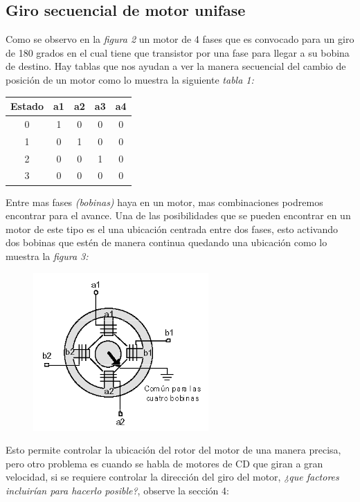 \documentclass[11pt,a4paper]{article}
\begin{document}
\newpage

\subsection{Giro secuencial de motor unifase}
Como se observo en la \emph{figura 2} un motor de 4 fases que es convocado para un giro de 180 grados en el cual tiene que transistor por una fase para llegar a su bobina de destino. Hay tablas que nos ayudan a ver la manera secuencial del cambio de posición de un motor como lo muestra la siguiente \emph{tabla 1:}


\begin{center}
\begin{tabular}{|c|c|c|c|c|}
\hline 
Estado & a1 & a2 & a3 & a4 \\ 
\hline 
0 & 1 & 0 & 0 & 0 \\ 
\hline 
1 & 0 & 1 & 0 & 0 \\ 
\hline 
2 & 0 & 0 & 1 & 0\\ 
\hline 
3 & 0 & 0 & 0 & 0\\
\hline
\end{tabular} 
\end{center}

Entre mas fases \emph{(bobinas)} haya en un motor, mas combinaciones podremos encontrar para el avance. Una de las posibilidades que se pueden encontrar en un motor de este tipo es el una ubicación centrada entre dos fases, esto activando dos bobinas que estén de manera continua quedando una ubicación como lo muestra la \emph{figura 3:}

\begin{figure}[h]
\begin{center}
\includegraphics[scale=0.6]{4.png}
\end{center}
\end{figure}

Esto permite controlar la ubicación del rotor del motor de una manera precisa, pero otro problema es cuando se habla de motores de CD que giran a gran velocidad, si se requiere controlar la dirección del giro del motor, \emph{¿que factores incluirían para hacerlo posible?}, observe la sección 4:
\end{document}
